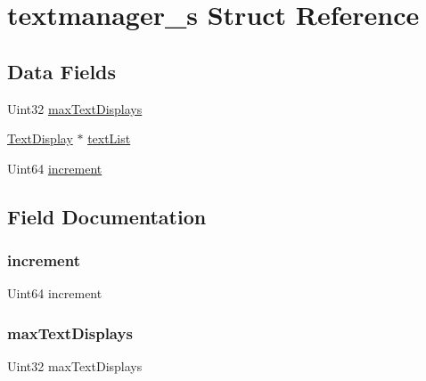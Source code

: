 \hypertarget{structtextmanager__s}{}\section{textmanager\+\_\+s Struct Reference}
\label{structtextmanager__s}
\subsection*{Data Fields}
\begin{DoxyCompactItemize}
\item 
Uint32 \hyperlink{structtextmanager__s_aad759ca5b5ca2719b916d629df38aafb}{max\+Text\+Displays}
\item 
\hyperlink{text__s_8h_ad683586873c96cc0104ec26d2a21b580}{Text\+Display} $\ast$ \hyperlink{structtextmanager__s_a06b3b86095c6b01a4b2a4f69376167e0}{text\+List}
\item 
Uint64 \hyperlink{structtextmanager__s_ab08657e2d8ce2eb598d448722ef0959b}{increment}
\end{DoxyCompactItemize}


\subsection{Field Documentation}
\mbox{\label{structtextmanager__s_ab08657e2d8ce2eb598d448722ef0959b}} 
\subsubsection{\texorpdfstring{increment}{increment}}
{\footnotesize\ttfamily Uint64 increment}

\mbox{\label{structtextmanager__s_aad759ca5b5ca2719b916d629df38aafb}} 
\subsubsection{\texorpdfstring{max\+Text\+Displays}{maxTextDisplays}}
{\footnotesize\ttfamily Uint32 max\+Text\+Displays}

\mbox{\label{structtextmanager__s_a06b3b86095c6b01a4b2a4f69376167e0}} 
